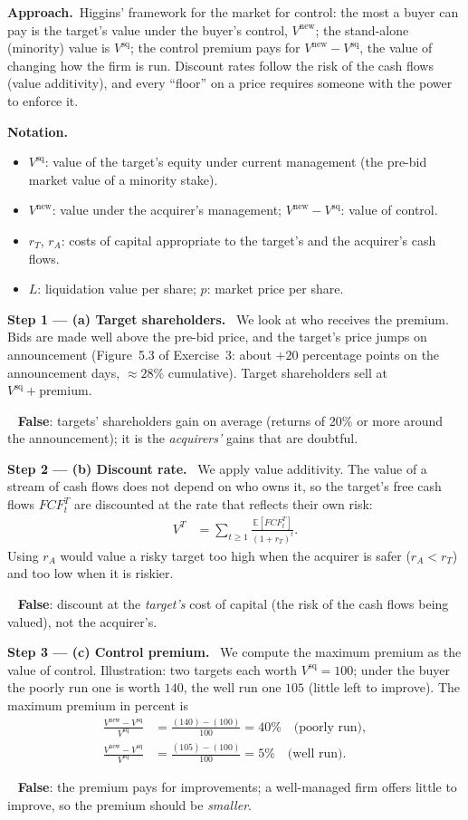 \documentclass[11pt,a4paper]{article}
\newcommand{\notation}{\par\noindent\textbf{Notation.}}
\newcommand{\step}[2]{\par\medskip\noindent\textbf{Step #1 --- #2.}~}
\newcommand{\approach}{\par\smallskip\noindent\textbf{Approach.}~}
\newcommand{\answer}[1]{\par\smallskip\noindent\fbox{\textbf{Answer #1.}}~}
\newcommand{\E}{\mathbb{E}}
\begin{document}
\approach Higgins' framework for the market for control: the most a buyer can pay is the target's
value under the buyer's control, $V^{\text{new}}$; the stand-alone (minority) value is $V^{\text{sq}}$;
the control premium pays for $V^{\text{new}}-V^{\text{sq}}$, the value of changing how the firm is run.
Discount rates follow the risk of the cash flows (value additivity), and every ``floor'' on a price
requires someone with the power to enforce it.

\notation
\begin{itemize}
  \item $V^{\text{sq}}$: value of the target's equity under current management (the pre-bid market value of a minority stake).
  \item $V^{\text{new}}$: value under the acquirer's management; $V^{\text{new}}-V^{\text{sq}}$: value of control.
  \item $r_T$, $r_A$: costs of capital appropriate to the target's and the acquirer's cash flows.
  \item $L$: liquidation value per share; $p$: market price per share.
\end{itemize}

\step{1}{(a) Target shareholders} We look at who receives the premium. Bids are made well above the
pre-bid price, and the target's price jumps on announcement (Figure~5.3 of Exercise~3: about
$+20$ percentage points on the announcement days, $\approx 28\%$ cumulative). Target shareholders sell
at $V^{\text{sq}}+\text{premium}$.
\answer{(a)} \textbf{False}: targets' shareholders gain on average (returns of 20\% or more around the
announcement); it is the \emph{acquirers'} gains that are doubtful.

\step{2}{(b) Discount rate} We apply value additivity. The value of a stream of cash flows does not
depend on who owns it, so the target's free cash flows $FCF_t^T$ are discounted at the rate that reflects
their own risk:
\begin{align}
  V^T &= \sum_{t\ge 1}\frac{\E[FCF_t^T]}{(1+r_T)^t}. \label{r9e1-dcf}
\end{align}
Using $r_A$ would value a risky target too high when the acquirer is safer ($r_A<r_T$) and too low when it
is riskier.
\answer{(b)} \textbf{False}: discount at the \emph{target's} cost of capital (the risk of the cash flows
being valued), not the acquirer's.

\step{3}{(c) Control premium} We compute the maximum premium as the value of control. Illustration: two
targets each worth $V^{\text{sq}}=100$; under the buyer the poorly run one is worth $140$, the well run one
$105$ (little left to improve). The maximum premium in percent is
\begin{align}
  \frac{V^{\text{new}}-V^{\text{sq}}}{V^{\text{sq}}} &= \frac{(140)-(100)}{100}=40\% \quad\text{(poorly run)}, \nonumber\\
  \frac{V^{\text{new}}-V^{\text{sq}}}{V^{\text{sq}}} &= \frac{(105)-(100)}{100}=5\% \quad\text{(well run)}. \nonumber
\end{align}
\answer{(c)} \textbf{False}: the premium pays for improvements; a well-managed firm offers little to
improve, so the premium should be \emph{smaller}.
\end{document}
